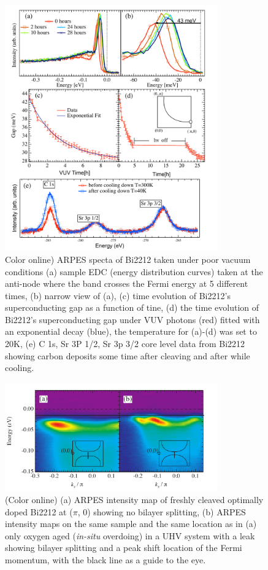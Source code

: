 \documentclass[aps,twocolumn,amsmath,amssymb,showpacs,prb,
superscriptaddress,unsortedaddress]{revtex4}
\begin{document}
\begin{figure}
\includegraphics[width=3.6in]{fig1.pdf}
\caption{Color online) ARPES specta of Bi2212 taken under poor vacuum
conditions (a) sample EDC (energy distribution curves) taken at the
anti-node where the band crosses the Fermi energy at 5 different
times, (b) narrow view of (a), (c) time evolution of Bi2212's
superconducting gap as a function of tine, (d) the time evolution of
Bi2212's superconducting gap under VUV photons (red) fitted with an
exponential decay (blue), the temperature for (a)-(d) was set to 20K, 
(e) C 1s, Sr 3P 1/2, Sr 3p 3/2 core level data from Bi2212 showing
carbon deposits some time after cleaving and after while cooling.}
\label{Fig. 1}
\end{figure}

\begin{figure}
\includegraphics[width=3.6in]{fig2.pdf}
\caption{(Color online) (a) ARPES intensity map of freshly cleaved
optimally doped Bi2212 at ($\pi$, 0) showing no bilayer splitting, (b)
ARPES intensity maps on the same sample and the same location as in
(a) only oxygen aged (\textit{in-situ} overdoing) in a UHV system with
a leak showing bilayer splitting and a peak shift location of the
Fermi momentum, with the black line as a guide to the eye.}
\label{Fig. 2}
\end{figure}
\end{document}
